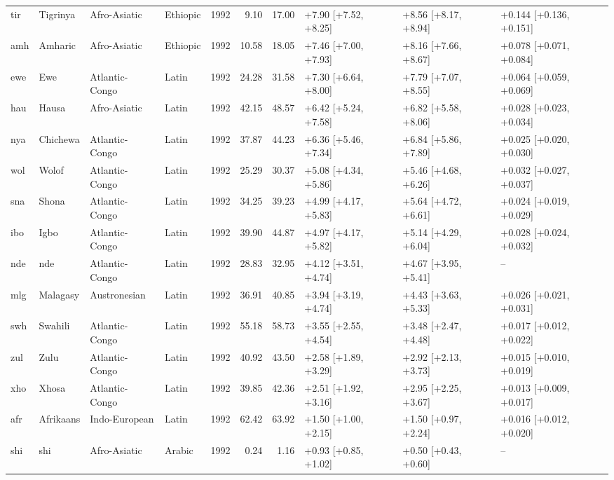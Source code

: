 {\begin{longtable}{@{}lllllrrlll@{}}
tir & Tigrinya & Afro-Asiatic & Ethiopic & 1992 & 9.10 & 17.00 & +7.90 [+7.52, +8.25] & +8.56 [+8.17, +8.94] & +0.144 [+0.136, +0.151] \\
amh & Amharic & Afro-Asiatic & Ethiopic & 1992 & 10.58 & 18.05 & +7.46 [+7.00, +7.93] & +8.16 [+7.66, +8.67] & +0.078 [+0.071, +0.084] \\
ewe & Ewe & Atlantic-Congo & Latin & 1992 & 24.28 & 31.58 & +7.30 [+6.64, +8.00] & +7.79 [+7.07, +8.55] & +0.064 [+0.059, +0.069] \\
hau & Hausa & Afro-Asiatic & Latin & 1992 & 42.15 & 48.57 & +6.42 [+5.24, +7.58] & +6.82 [+5.58, +8.06] & +0.028 [+0.023, +0.034] \\
nya & Chichewa & Atlantic-Congo & Latin & 1992 & 37.87 & 44.23 & +6.36 [+5.46, +7.34] & +6.84 [+5.86, +7.89] & +0.025 [+0.020, +0.030] \\
wol & Wolof & Atlantic-Congo & Latin & 1992 & 25.29 & 30.37 & +5.08 [+4.34, +5.86] & +5.46 [+4.68, +6.26] & +0.032 [+0.027, +0.037] \\
sna & Shona & Atlantic-Congo & Latin & 1992 & 34.25 & 39.23 & +4.99 [+4.17, +5.83] & +5.64 [+4.72, +6.61] & +0.024 [+0.019, +0.029] \\
ibo & Igbo & Atlantic-Congo & Latin & 1992 & 39.90 & 44.87 & +4.97 [+4.17, +5.82] & +5.14 [+4.29, +6.04] & +0.028 [+0.024, +0.032] \\
nde & nde & Atlantic-Congo & Latin & 1992 & 28.83 & 32.95 & +4.12 [+3.51, +4.74] & +4.67 [+3.95, +5.41] & -- \\
mlg & Malagasy & Austronesian & Latin & 1992 & 36.91 & 40.85 & +3.94 [+3.19, +4.74] & +4.43 [+3.63, +5.33] & +0.026 [+0.021, +0.031] \\
swh & Swahili & Atlantic-Congo & Latin & 1992 & 55.18 & 58.73 & +3.55 [+2.55, +4.54] & +3.48 [+2.47, +4.48] & +0.017 [+0.012, +0.022] \\
zul & Zulu & Atlantic-Congo & Latin & 1992 & 40.92 & 43.50 & +2.58 [+1.89, +3.29] & +2.92 [+2.13, +3.73] & +0.015 [+0.010, +0.019] \\
xho & Xhosa & Atlantic-Congo & Latin & 1992 & 39.85 & 42.36 & +2.51 [+1.92, +3.16] & +2.95 [+2.25, +3.67] & +0.013 [+0.009, +0.017] \\
afr & Afrikaans & Indo-European & Latin & 1992 & 62.42 & 63.92 & +1.50 [+1.00, +2.15] & +1.50 [+0.97, +2.24] & +0.016 [+0.012, +0.020] \\
shi & shi & Afro-Asiatic & Arabic & 1992 & 0.24 & 1.16 & +0.93 [+0.85, +1.02] & +0.50 [+0.43, +0.60] & -- \\
\end{longtable}}
